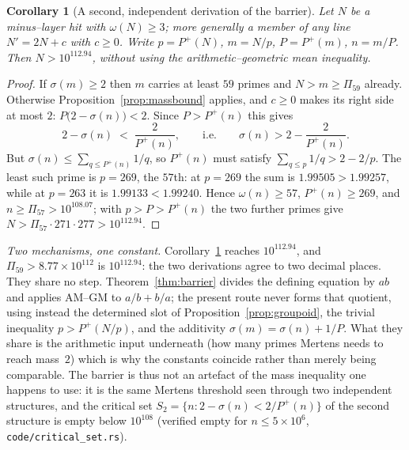 \documentclass[11pt]{article}
\newtheorem{corollary}[theorem]{Corollary}
\theoremstyle{definition}
\begin{document}
\begin{corollary}[A second, independent derivation of the barrier]\label{cor:secondbarrier}
Let $N$ be a minus--layer hit with $\omega(N)\ge3$; more generally a member of any line
$N'=2N+c$ with $c\ge0$. Write $p=P^+(N)$, $m=N/p$, $P=P^+(m)$, $n=m/P$. Then
$N>10^{112.94}$, without using the arithmetic--geometric mean inequality.
\end{corollary}
\begin{proof}
If $\sigma(m)\ge2$ then $m$ carries at least $59$ primes and $N>m\ge\Pi_{59}$ already. Otherwise
Proposition~\ref{prop:massbound} applies, and $c\ge0$ makes its right side at most $2$:
$P\bigl(2-\sigma(n)\bigr)<2$. Since $P>P^+(n)$ this gives
\[ 2-\sigma(n)\;<\;\frac2{P^+(n)},\qquad\text{i.e.}\qquad \sigma(n)>2-\frac2{P^+(n)}. \]
But $\sigma(n)\le\sum_{q\le P^+(n)}1/q$, so $P^+(n)$ must satisfy
$\sum_{q\le p}1/q>2-2/p$. The least such prime is $p=269$, the $57$th: at $p=269$ the sum is
$1.99505>1.99257$, while at $p=263$ it is $1.99133<1.99240$. Hence $\omega(n)\ge57$,
$P^+(n)\ge269$, and $n\ge\Pi_{57}>10^{108.07}$; with $p>P>P^+(n)$ the two further primes give
$N>\Pi_{57}\cdot271\cdot277>10^{112.94}$.
\end{proof}

\emph{Two mechanisms, one constant.} Corollary~\ref{cor:secondbarrier} reaches $10^{112.94}$, and $\Pi_{59}>8.77\times10^{112}$ is
$10^{112.94}$: the two derivations agree to two decimal places. They share no step.
Theorem~\ref{thm:barrier} divides the defining equation by $ab$ and applies AM--GM to
$a/b+b/a$; the present route never forms that quotient, using instead the determined slot of
Proposition~\ref{prop:groupoid}, the trivial inequality $p>P^+(N/p)$, and the additivity
$\sigma(m)=\sigma(n)+1/P$. What they share is the arithmetic input underneath (how many primes
Mertens needs to reach mass~$2$) which is why the constants coincide rather than merely being
comparable. The barrier is thus not an artefact of the mass inequality one happens to use: it is
the same Mertens threshold seen through two independent structures, and the critical set
$S_2=\{n:2-\sigma(n)<2/P^+(n)\}$ of the second structure is empty below $10^{108}$ (verified empty
for $n\le5\times10^6$, \texttt{code/critical\_set.rs}).
\end{document}
